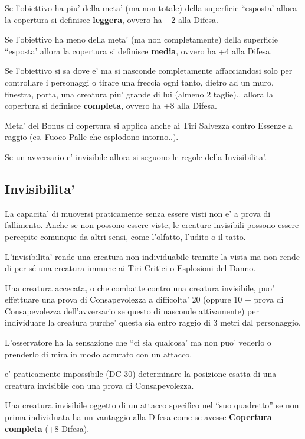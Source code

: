 \documentclass[a4paper,11pt,twoside,openany]{dndbook}
\begin{document}
Se l'obiettivo ha piu' della meta' (ma non totale) della superficie ``esposta' allora la copertura si definisce \textbf{leggera}, ovvero ha +2 alla Difesa.

Se l'obiettivo ha meno della meta' (ma non completamente) della superficie ``esposta' allora la copertura si definisce \textbf{media}, ovvero ha +4 alla Difesa.

Se l'obiettivo si sa dove e' ma si nasconde completamente affacciandosi solo per controllare i personaggi o tirare una freccia ogni tanto, dietro ad un muro, finestra, porta, una creatura piu' grande di lui (almeno 2 taglie).. allora la copertura si definisce \textbf{completa}, ovvero ha +8 alla Difesa.

Meta' del Bonus di copertura si applica anche ai Tiri Salvezza contro
Essenze a raggio (es. Fuoco Palle che esplodono intorno..).

Se un avversario e' invisibile allora si seguono le regole della Invisibilita'.

\subsection{Invisibilita'}

\label{invisibilita}

La capacita' di muoversi praticamente senza essere visti non e' a prova di fallimento. Anche se non possono essere viste, le creature invisibili possono essere percepite comunque da altri sensi, come l'olfatto, l'udito o il tatto.

L'invisibilita' rende una creatura non individuabile tramite la vista ma non rende di per sé una creatura immune ai Tiri Critici o Esplosioni del Danno.

Una creatura accecata, o che combatte contro una creatura invisibile, puo' effettuare una prova di Consapevolezza a difficolta' 20 (oppure 10 + prova di Consapevolezza dell'avversario se questo di nasconde attivamente) per individuare la creatura purche' questa sia entro raggio di 3 metri dal personaggio.

L'osservatore ha la sensazione che ``ci sia qualcosa' ma non puo' vederlo o prenderlo di mira in modo accurato con un attacco.

e' praticamente impossibile (DC 30) determinare la posizione esatta di una creatura invisibile con una prova di Consapevolezza.

Una creatura invisibile oggetto di un attacco specifico nel ``suo quadretto'' se non prima individuata ha un vantaggio alla Difesa come se avesse \textbf{Copertura completa} (+8 Difesa).
\end{document}
